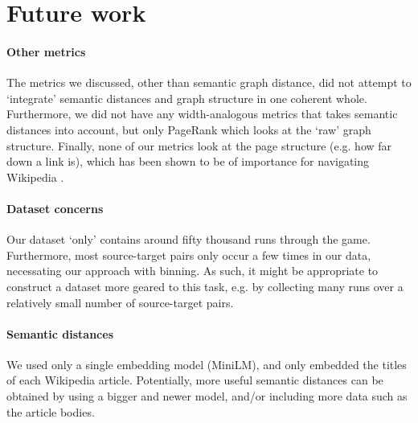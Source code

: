 \section{Future work}
\label{sec:future-work}
\paragraph{Other metrics}
The metrics we discussed, other than semantic graph distance, did not attempt to `integrate' semantic distances and graph structure in one coherent whole. Furthermore, we did not have any width-analogous metrics that takes semantic distances into account, but only PageRank which looks at the `raw' graph structure. Finally, none of our metrics look at the page structure (e.g. how far down a link is), which has been shown to be of importance for navigating Wikipedia \cite{lamprecht2017structure}.

\paragraph{Dataset concerns}
Our dataset `only' contains around fifty thousand runs through the game. Furthermore, most source-target pairs only occur a few times in our data, necessating our approach with binning. As such, it might be appropriate to construct a dataset more geared to this task, e.g. by collecting many runs over a relatively small number of source-target pairs.

\paragraph{Semantic distances}
We used only a single embedding model (MiniLM), and only embedded the titles of each Wikipedia article. Potentially, more useful semantic distances can be obtained by using a bigger and newer model, and/or including more data such as the article bodies.
